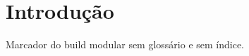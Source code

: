 \documentclass{abntexto-ufc}
\begin{document}
\textual
\section{Introdução}
Marcador do build modular sem glossário e sem índice.
\end{document}
